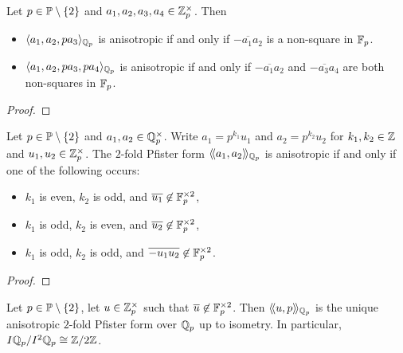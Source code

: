 \documentclass[12pt, leqno, british]{amsart}
\begin{document}
\begin{lem}\label{L:qqp-odd-4d-form}
Let $p \in \mathbb P \setminus \lbrace 2 \rbrace$ and $a_1, a_2, a_3, a_4 \in \mathbb Z_p^\times$.
Then
\begin{itemize}
\item $\langle a_1, a_2, pa_3 \rangle_{\mathbb Q_p}$ is anisotropic if and only if $\overline{-a_1a_2}$ is a non-square in $\mathbb F_p$.
\item $\langle a_1, a_2, pa_3, pa_4 \rangle_{\mathbb Q_p}$ is anisotropic if and only if $\overline{-a_1a_2}$ and $\overline{-a_3a_4}$ are both non-squares in $\mathbb F_p$.
\end{itemize}
\end{lem}
\begin{proof}

\end{proof}
\begin{prop}\label{P:2-fold-Pfister-qqp-odd}
Let $p \in \mathbb P \setminus \lbrace 2 \rbrace$ and $a_1, a_2 \in \mathbb Q_p^ \times$.
Write $a_1 = p^{k_1}u_1$ and $a_2 = p^{k_2}u_2$ for $k_1, k_2 \in \mathbb Z$ and $u_1, u_2 \in \mathbb Z_p^\times$.
The $2$-fold Pfister form $\langle\!\langle a_1, a_2 \rangle\!\rangle_{\mathbb Q_p}$ is anisotropic if and only if one of the following occurs:
\begin{itemize}
\item $k_1$ is even, $k_2$ is odd, and $\overline{u_1} \not\in \mathbb F_p^{\times 2}$,
\item $k_1$ is odd, $k_2$ is even, and $\overline{u_2} \not\in \mathbb F_p^{\times 2}$,
\item $k_1$ is odd, $k_2$ is odd, and $\overline{-u_1u_2} \not\in \mathbb F_p^{\times 2}$.
\end{itemize}
\end{prop}
\begin{proof}

\end{proof}
\begin{cor}\label{C:unique-2-fold-Pfister-qqp-odd}
Let $p \in \mathbb P \setminus \lbrace 2 \rbrace$, let $u \in \mathbb Z_p^\times$ such that $\overline{u} \not\in \mathbb F_p^{\times 2}$.
Then $\langle\!\langle u, p \rangle\!\rangle_{\mathbb Q_p}$ is the unique anisotropic $2$-fold Pfister form over $\mathbb Q_p$ up to isometry.
In particular, $I\mathbb Q_p/I^2\mathbb Q_p \cong \mathbb Z/2\mathbb Z$.
\end{cor}
\end{document}
